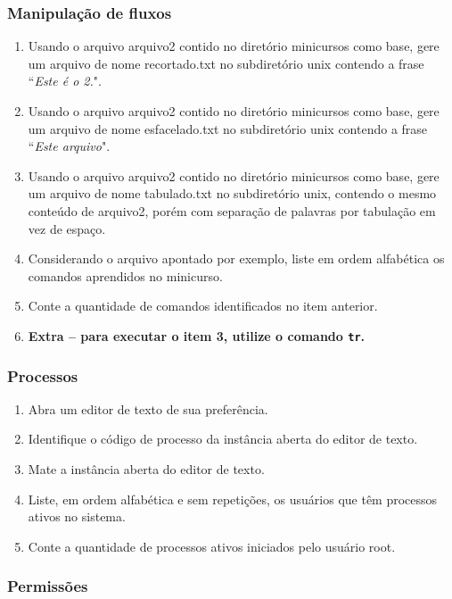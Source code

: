 \documentclass[a4paper,10pt,titlepage,twosided]{book}
\begin{document}
\subsubsection{Manipulação de fluxos}

\begin{enumerate}
\medskip
\item Usando o arquivo \textsf{arquivo2} contido no diretório \textsf{minicursos} como base, gere um arquivo de nome \textsf{recortado.txt} no subdiretório \textsf{unix} contendo a frase ``\emph{Este é o 2.}".
\item Usando o arquivo \textsf{arquivo2} contido no diretório \textsf{minicursos} como base, gere um arquivo de nome \textsf{esfacelado.txt} no subdiretório \textsf{unix} contendo a frase ``\emph{Este arquivo}".
\item Usando o arquivo \textsf{arquivo2} contido no diretório \textsf{minicursos} como base, gere um arquivo de nome \textsf{tabulado.txt} no subdiretório \textsf{unix}, contendo o mesmo conteúdo de \textsf{arquivo2}, porém com separação de palavras por tabulação em vez de espaço.
\item Considerando o arquivo apontado por \textsf{exemplo}, liste em ordem alfabética os comandos aprendidos no minicurso.
\item Conte a quantidade de comandos identificados no item anterior.
\item[] \textbf{Extra -- para executar o item 3, utilize o comando \texttt{tr}.}
\end{enumerate}

\subsubsection{Processos}

\begin{enumerate}
\medskip
\item Abra um editor de texto de sua preferência.
\item Identifique o código de processo da instância aberta do editor de texto.
\item Mate a instância aberta do editor de texto.
\item Liste, em ordem alfabética e sem repetições, os usuários que têm processos ativos no sistema.
\item Conte a quantidade de processos ativos iniciados pelo usuário \textsf{root}.
\end{enumerate}

\subsubsection{Permissões}
\end{document}
